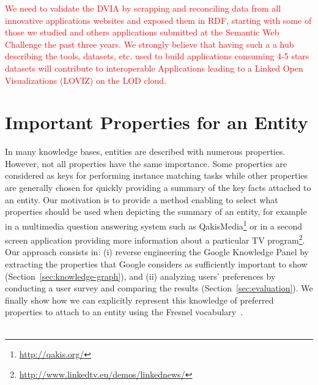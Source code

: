 \textcolor{red}{We need to validate the DVIA by scrapping and reconciling data from all innovative applications websites and exposed them in RDF, starting with some of those we studied and others applications submitted at the Semantic Web Challenge the past three years. We strongly believe that having such a a hub  describing the tools, datasets, etc.  used to build  applications consuming 4-5 stars datasets will contribute to interoperable Applications leading to a Linked Open Visualizations (LOVIZ) on the LOD cloud.}


\section{Important Properties for an Entity}
\label{sec:propEntities}
In many knowledge bases, entities are described with numerous properties. However, not all properties have the same importance. Some properties are considered as keys for performing instance matching tasks while other properties are generally chosen for quickly providing a summary of the key facts attached to an entity. Our motivation is to provide a method enabling to select what properties should be used when depicting the summary of an entity, for example in a multimedia question answering system such as QakisMedia\footnote{\url{http://qakis.org/}} or in a second screen application providing more information about a particular TV program\footnote{\url{http://www.linkedtv.eu/demos/linkednews/}}. Our approach consists in: (i) reverse engineering the Google Knowledge Panel by extracting the properties that Google considers as sufficiently important to show (Section~\ref{sec:knowledge-graph}), and (ii) analyzing users' preferences by conducting a user survey and comparing the results (Section~\ref{sec:evaluation}). We finally show how we can explicitly represent this knowledge of preferred properties to attach to an entity using the Fresnel vocabulary~\cite{pietriga2006}. \\
 \\

